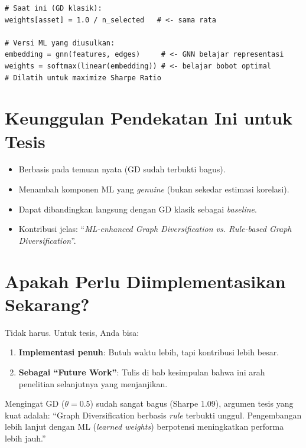\documentclass{article}
\begin{document}
\begin{lstlisting}[caption=Perbandingan Kode GD Klasik vs ML]
# Saat ini (GD klasik):
weights[asset] = 1.0 / n_selected   # <- sama rata

# Versi ML yang diusulkan:
embedding = gnn(features, edges)     # <- GNN belajar representasi
weights = softmax(linear(embedding)) # <- belajar bobot optimal
# Dilatih untuk maximize Sharpe Ratio
\end{lstlisting}

\section*{Keunggulan Pendekatan Ini untuk Tesis}
\begin{itemize}
    \item[\checkmark] Berbasis pada temuan nyata (GD sudah terbukti bagus).
    \item[\checkmark] Menambah komponen ML yang \textit{genuine} (bukan sekedar estimasi korelasi).
    \item[\checkmark] Dapat dibandingkan langsung dengan GD klasik sebagai \textit{baseline}.
    \item[\checkmark] Kontribusi jelas: ``\textit{ML-enhanced Graph Diversification vs. Rule-based Graph Diversification}''.
\end{itemize}

\section*{Apakah Perlu Diimplementasikan Sekarang?}
Tidak harus. Untuk tesis, Anda bisa:
\begin{enumerate}
    \item \textbf{Implementasi penuh}: Butuh waktu lebih, tapi kontribusi lebih besar.
    \item \textbf{Sebagai ``Future Work''}: Tulis di bab kesimpulan bahwa ini arah penelitian selanjutnya yang menjanjikan.
\end{enumerate}

Mengingat GD ($\theta=0.5$) sudah sangat bagus (Sharpe 1.09), argumen tesis yang kuat adalah: ``Graph Diversification berbasis \textit{rule} terbukti unggul. Pengembangan lebih lanjut dengan ML (\textit{learned weights}) berpotensi meningkatkan performa lebih jauh.''
\end{document}
